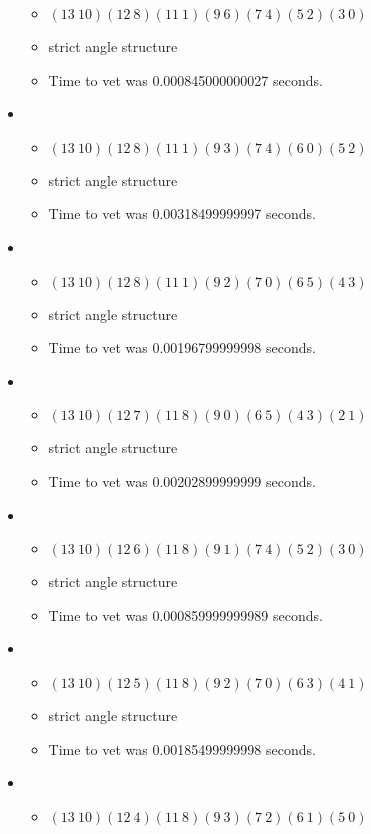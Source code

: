 \documentclass{article}
\begin{document}
\begin{itemize}
\begin{itemize}
      \item $(13\ 10)(12\ 8)(11\ 1)(9\ 6)(7\ 4)(5\ 2)(3\ 0)$
      \item strict angle structure
      \item Time to vet was 0.000845000000027 seconds.
\end{itemize}
\item \begin{itemize}
      \item $(13\ 10)(12\ 8)(11\ 1)(9\ 3)(7\ 4)(6\ 0)(5\ 2)$
      \item strict angle structure
      \item Time to vet was 0.00318499999997 seconds.
\end{itemize}
\item \begin{itemize}
      \item $(13\ 10)(12\ 8)(11\ 1)(9\ 2)(7\ 0)(6\ 5)(4\ 3)$
      \item strict angle structure
      \item Time to vet was 0.00196799999998 seconds.
\end{itemize}
\item \begin{itemize}
      \item $(13\ 10)(12\ 7)(11\ 8)(9\ 0)(6\ 5)(4\ 3)(2\ 1)$
      \item strict angle structure
      \item Time to vet was 0.00202899999999 seconds.
\end{itemize}
\item \begin{itemize}
      \item $(13\ 10)(12\ 6)(11\ 8)(9\ 1)(7\ 4)(5\ 2)(3\ 0)$
      \item strict angle structure
      \item Time to vet was 0.000859999999989 seconds.
\end{itemize}
\item \begin{itemize}
      \item $(13\ 10)(12\ 5)(11\ 8)(9\ 2)(7\ 0)(6\ 3)(4\ 1)$
      \item strict angle structure
      \item Time to vet was 0.00185499999998 seconds.
\end{itemize}
\item \begin{itemize}
      \item $(13\ 10)(12\ 4)(11\ 8)(9\ 3)(7\ 2)(6\ 1)(5\ 0)$

\end{itemize}
\end{itemize}
\end{document}
